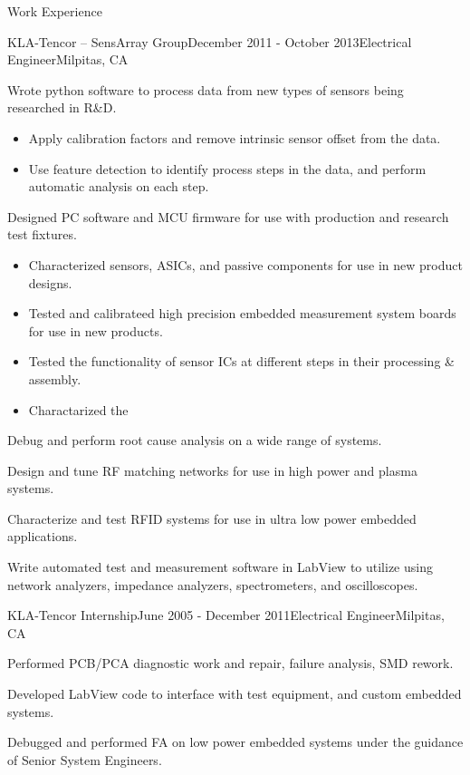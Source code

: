 \documentclass{resume} %
\begin{document}
\begin{rSection}{Work Experience}
\begin{rSubsection}{KLA-Tencor -- SensArray Group}{December 2011 - October 2013}{Electrical Engineer}{Milpitas, CA}
\item Wrote python software to process data from new types of sensors being researched in R\&D.
\begin{itemize}
\itemsep -0.5em \vspace{-0.5em}
\renewcommand{\labelitemi}{-}
\item Apply calibration factors and remove intrinsic sensor offset from the data.
\item Use feature detection to identify process steps in the data, and perform automatic analysis on each step.
\end{itemize}
\medskip

\item Designed PC software and MCU firmware for use with production and research test fixtures.
\begin{itemize}
\itemsep -0.5em \vspace{-0.5em}
\renewcommand{\labelitemi}{-}
\item Characterized sensors, ASICs, and passive components for use in new product designs.
\item Tested and calibrateed high precision embedded measurement system boards for use in new products.
\item Tested the functionality of sensor ICs at different steps in their processing \& assembly.
\item Charactarized the 
\end{itemize}
\medskip

\item Debug and perform root cause analysis on a wide range of systems.
\item Design and tune RF matching networks for use in high power and plasma systems.
\item Characterize and test RFID systems for use in ultra low power embedded applications.
\item Write automated test and measurement software in LabView to utilize using network analyzers, impedance analyzers, spectrometers, and oscilloscopes.

\end{rSubsection}


\begin{rSubsection}{KLA-Tencor Internship}{June 2005 - December 2011}{Electrical Engineer}{Milpitas, CA}
\item Performed PCB/PCA diagnostic work and repair, failure analysis, SMD rework.
\item Developed LabView code to interface with test equipment, and custom embedded systems.
\item Debugged and performed FA on low power embedded systems under the guidance of Senior System Engineers. 
\end{rSubsection}

\end{rSection}
\end{document}

